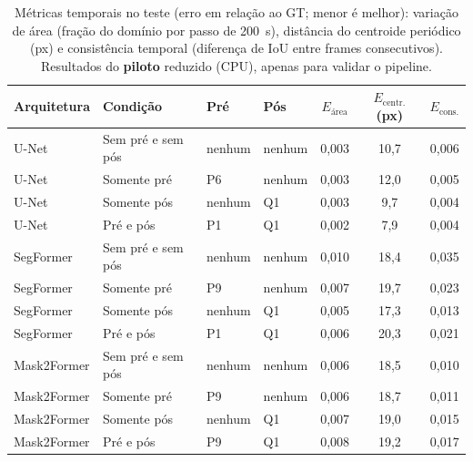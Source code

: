 \begin{table}[t]\centering\scriptsize
\caption{Métricas temporais no teste (erro em relação ao GT; menor é melhor): variação de área (fração do domínio por passo de 200~s), distância do centroide periódico (px) e consistência temporal (diferença de IoU entre frames consecutivos). Resultados do \textbf{piloto} reduzido (CPU), apenas para validar o pipeline.}\label{tab:temporais}
\begin{tabular}{llllccc}
\toprule
Arquitetura & Condição & Pré & Pós & $E_{\text{área}}$ & $E_{\text{centr.}}$ (px) & $E_{\text{cons.}}$ \\
\midrule
U-Net & Sem pré e sem pós & nenhum & nenhum & 0,003 & 10,7 & 0,006 \\
U-Net & Somente pré & P6 & nenhum & 0,003 & 12,0 & 0,005 \\
U-Net & Somente pós & nenhum & Q1 & 0,003 & 9,7 & 0,004 \\
U-Net & Pré e pós & P1 & Q1 & 0,002 & 7,9 & 0,004 \\
\midrule
SegFormer & Sem pré e sem pós & nenhum & nenhum & 0,010 & 18,4 & 0,035 \\
SegFormer & Somente pré & P9 & nenhum & 0,007 & 19,7 & 0,023 \\
SegFormer & Somente pós & nenhum & Q1 & 0,005 & 17,3 & 0,013 \\
SegFormer & Pré e pós & P1 & Q1 & 0,006 & 20,3 & 0,021 \\
\midrule
Mask2Former & Sem pré e sem pós & nenhum & nenhum & 0,006 & 18,5 & 0,010 \\
Mask2Former & Somente pré & P9 & nenhum & 0,006 & 18,7 & 0,011 \\
Mask2Former & Somente pós & nenhum & Q1 & 0,007 & 19,0 & 0,015 \\
Mask2Former & Pré e pós & P9 & Q1 & 0,008 & 19,2 & 0,017 \\
\bottomrule
\end{tabular}
\end{table}
